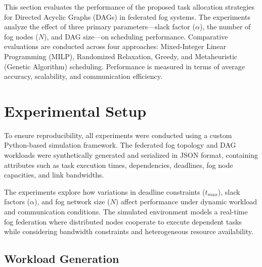 \documentclass[conference]{IEEEtran}
\begin{document}
This section evaluates the performance of the proposed task allocation strategies for Directed Acyclic Graphs (DAGs) in federated fog systems. The experiments analyze the effect of three primary parameters—slack factor ($\alpha$), the number of fog nodes ($N$), and DAG size—on scheduling performance. Comparative evaluations are conducted across four approaches: Mixed-Integer Linear Programming (MILP), Randomized Relaxation, Greedy, and Metaheuristic (Genetic Algorithm) scheduling. Performance is measured in terms of average accuracy, scalability, and communication efficiency.

\section{Experimental Setup}

To ensure reproducibility, all experiments were conducted using a custom Python-based simulation framework. The federated fog topology and DAG workloads were synthetically generated and serialized in JSON format, containing attributes such as task execution times, dependencies, deadlines, fog node capacities, and link bandwidths.

The experiments explore how variations in deadline constraints ($t_{max}$), slack factors ($\alpha$), and fog network size ($N$) affect performance under dynamic workload and communication conditions. The simulated environment models a real-time fog federation where distributed nodes cooperate to execute dependent tasks while considering bandwidth constraints and heterogeneous resource availability.

\subsection{Workload Generation}
\end{document}
